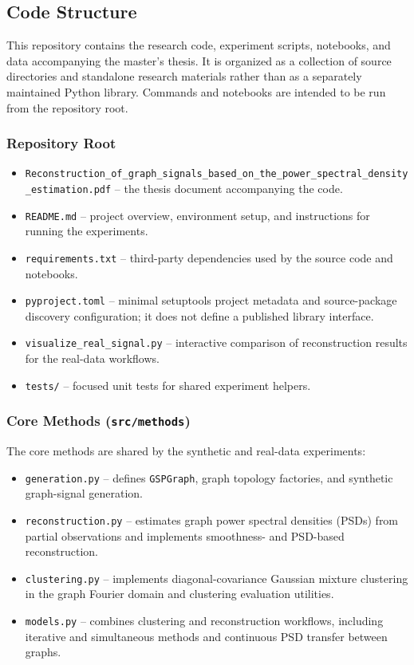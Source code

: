 \subsection{Code Structure}

This repository contains the research code, experiment scripts, notebooks, and data accompanying the master's thesis. It is organized as a collection of source directories and standalone research materials rather than as a separately maintained Python library. Commands and notebooks are intended to be run from the repository root.

\subsubsection{Repository Root}

\begin{itemize}
    \item \texttt{Reconstruction\_of\_graph\_signals\_based\_on\_the\_power\_spectral\_density\_estimation.pdf} -- the thesis document accompanying the code.
    \item \texttt{README.md} -- project overview, environment setup, and instructions for running the experiments.
    \item \texttt{requirements.txt} -- third-party dependencies used by the source code and notebooks.
    \item \texttt{pyproject.toml} -- minimal setuptools project metadata and source-package discovery configuration; it does not define a published library interface.
    \item \texttt{visualize\_real\_signal.py} -- interactive comparison of reconstruction results for the real-data workflows.
    \item \texttt{tests/} -- focused unit tests for shared experiment helpers.
\end{itemize}

\subsubsection{Core Methods (\texttt{src/methods})}

The core methods are shared by the synthetic and real-data experiments:
\begin{itemize}
    \item \texttt{generation.py} -- defines \texttt{GSPGraph}, graph topology factories, and synthetic graph-signal generation.
    \item \texttt{reconstruction.py} -- estimates graph power spectral densities (PSDs) from partial observations and implements smoothness- and PSD-based reconstruction.
    \item \texttt{clustering.py} -- implements diagonal-covariance Gaussian mixture clustering in the graph Fourier domain and clustering evaluation utilities.
    \item \texttt{models.py} -- combines clustering and reconstruction workflows, including iterative and simultaneous methods and continuous PSD transfer between graphs.
\end{itemize}

